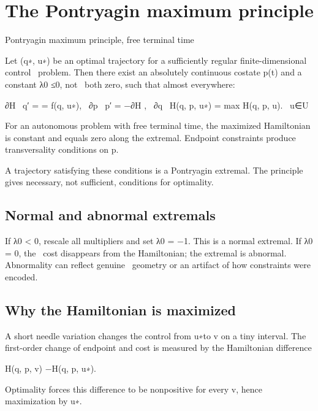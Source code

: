 \section{The Pontryagin maximum principle}

Pontryagin maximum principle, free terminal time


\begin{displaytext}
Let (q∗, u∗) be an optimal trajectory for a sufficiently regular finite-dimensional control \
problem. Then there exist an absolutely continuous costate p(t) and a constant λ0 ≤0, not \
both zero, such that almost everywhere:
\end{displaytext}

\begin{displaytext}
∂H \
q′ = = f(q, u∗), \
∂p \
p′ = −∂H , \
∂q \
H(q, p, u∗) = max H(q, p, u). \
u∈U
\end{displaytext}

For an autonomous problem with free terminal time, the maximized Hamiltonian is constant and equals zero along the extremal. Endpoint constraints produce transversality conditions on p.


A trajectory satisfying these conditions is a Pontryagin extremal. The principle gives necessary, not sufficient, conditions for optimality.


\subsection{Normal and abnormal extremals}

\begin{displaytext}
If λ0 < 0, rescale all multipliers and set λ0 = −1. This is a normal extremal. If λ0 = 0, the \
cost disappears from the Hamiltonian; the extremal is abnormal. Abnormality can reflect genuine \
geometry or an artifact of how constraints were encoded.
\end{displaytext}

\subsection{Why the Hamiltonian is maximized}

A short needle variation changes the control from u∗to v on a tiny interval. The first-order change of endpoint and cost is measured by the Hamiltonian difference


H(q, p, v) −H(q, p, u∗).


Optimality forces this difference to be nonpositive for every v, hence maximization by u∗.


